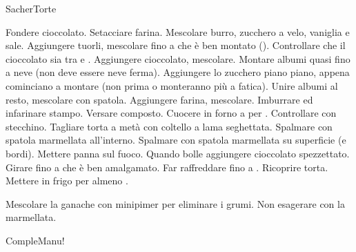 \begin{recipe}{SacherTorte}
    \begin{header}
    
    \end{header}
    
    \begin{ingredients}[15]
    \end{ingredients}
    
    \begin{preparation}
        \step Fondere cioccolato.
        \step Setacciare farina.
        \step Mescolare burro, zucchero a velo, vaniglia e sale.
        \step Aggiungere tuorli, mescolare fino a che è ben montato ().
        \step Controllare che il cioccolato sia tra  e .
        \step Aggiungere cioccolato, mescolare.
        \step Montare albumi quasi fino a neve (non deve essere neve ferma).\newline
            Aggiungere lo zucchero piano piano, appena cominciano a montare (non prima o monteranno più a fatica).
        \step Unire albumi al resto, mescolare con spatola.
        \step Aggiungere farina, mescolare.
        \step Imburrare ed infarinare stampo.
        \step Versare composto.
        \step Cuocere in forno a  per .
        \step Controllare con stecchino.
        \step Tagliare torta a metà con coltello a lama seghettata.
        \step Spalmare con spatola marmellata all'interno.
        \step Spalmare con spatola marmellata su superficie (e bordi).
        \step Mettere panna sul fuoco.
        \step Quando bolle aggiungere cioccolato spezzettato.
        \step Girare fino a che è ben amalgamato.
        \step Far raffreddare fino a .
        \step Ricoprire torta.
        \step Mettere in frigo per almeno .
    \end{preparation}
    
    \begin{suggestion}
        \suggestionMark Mescolare la ganache con minipimer per eliminare i grumi.
        \suggestionMark Non esagerare con la marmellata.
    \end{suggestion}
    
    \begin{hint}
        CompleManu!
    \end{hint}
\end{recipe}
